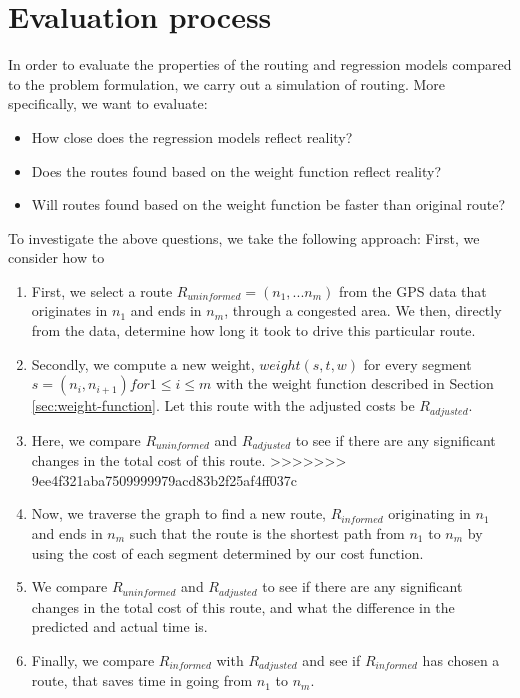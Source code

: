 \section{Evaluation process}
In order to evaluate the properties of the routing and regression models compared to the problem formulation, we carry out a simulation of routing. More specifically, we want to evaluate:
\begin{itemize}
\item How close does the regression models reflect reality?
\item Does the routes found based on the weight function reflect reality?
\item Will routes found based on the weight function be faster than original route?
\end{itemize}
To investigate the above questions, we take the following approach:
First, we consider how to
\begin{enumerate}
\item First, we select a route $R_{uninformed}=(n_1,...n_m)$ from the GPS data that originates in $n_1$ and ends in $n_m$, through a congested area. We then, directly from the data, determine how long it took to drive this particular route.
\item Secondly, we compute a new weight, $weight(s, t, w)$ for every segment $s=(n_i,n_{i+1}) for 1 \leq i \leq m$ with the weight function described in Section \ref{sec:weight-function}. Let this route with the adjusted costs be $R_{adjusted}$.
\item Here, we compare $R_{uninformed}$ and $R_{adjusted}$ to see if there are any significant changes in the total cost of this route.
>>>>>>> 9ee4f321aba7509999979acd83b2f25af4ff037c
\item Now, we traverse the graph to find a new route, $R_{informed}$ originating in $n_1$ and ends in $n_m$ such that the route is the shortest path from $n_1$ to $n_m$ by using the cost of each segment determined by our cost function.
\item We compare $R_{uninformed}$ and $R_{adjusted}$ to see if there are any significant changes in the total cost of this route, and what the difference in the predicted and actual time is.
\item Finally, we compare $R_{informed}$ with $R_{adjusted}$ and see if $R_{informed}$ has chosen a route, that saves time in going from $n_1$ to $n_m$.
\end{enumerate}
